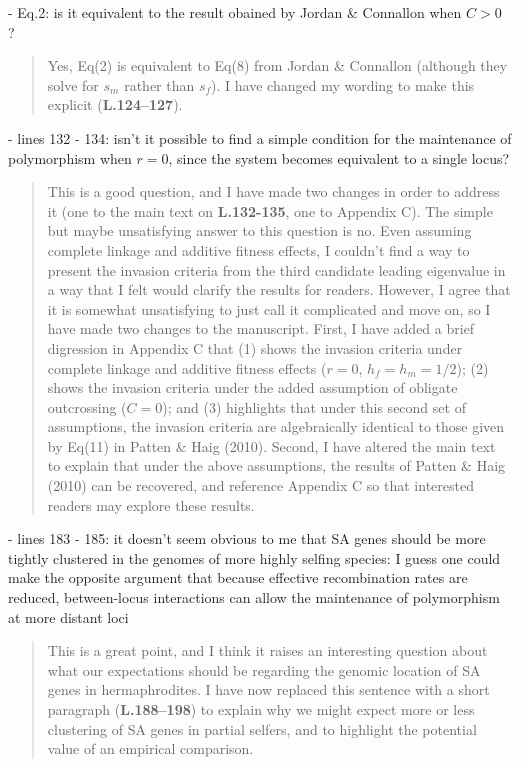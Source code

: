 \documentclass[11pt]{article}
\begin{document}
 - Eq.2: is it equivalent to the result obained by Jordan \& Connallon when $C > 0$ ?

	\begin{quote}
		Yes, Eq(2) is equivalent to Eq(8) from Jordan \& Connallon (although they solve for $s_m$ rather than $s_f$). I have changed my wording to make this explicit (\textbf{L.124--127}).
	\end{quote}

 - lines 132 - 134: isn't it possible to find a simple condition for the maintenance of polymorphism when $r=0$, since the system becomes equivalent to a single locus?

	\begin{quote}
		This is a good question, and I have made two changes in order to address it (one to the main text on \textbf{L.132-135}, one to Appendix C). The simple but maybe unsatisfying answer to this question is no. Even assuming complete linkage and additive fitness effects, I couldn't find a way to present the invasion criteria from the third candidate leading eigenvalue in a way that I felt would clarify the results for readers. However, I agree that it is somewhat unsatisfying to just call it complicated and move on, so I have made two changes to the manuscript. First, I have added a brief digression in Appendix C that (1) shows the invasion criteria under complete linkage and additive fitness effects ($r=0$, $h_f=h_m=1/2$); (2) shows the invasion criteria under the added assumption of obligate outcrossing ($C=0$); and (3) highlights that under this second set of assumptions, the invasion criteria are algebraically identical to those given by Eq(11) in Patten \& Haig (2010). Second, I have altered the main text to explain that under the above assumptions, the results of Patten \& Haig (2010) can be recovered, and reference Appendix C so that interested readers may explore these results.
	\end{quote}

 - lines 183 - 185: it doesn't seem obvious to me that SA genes should be more tightly clustered in the genomes of more highly selfing species: I guess one could make the opposite argument that because effective recombination rates are reduced, between-locus interactions can allow the maintenance of polymorphism at more distant loci

	\begin{quote}
		This is a great point, and I think it raises an interesting question about what our expectations should be regarding the genomic location of SA genes in hermaphrodites. I have now replaced this sentence with a short paragraph (\textbf{L.188--198}) to explain why we might expect more or less clustering of SA genes in partial selfers, and to highlight the potential value of an empirical comparison. 
	\end{quote}
\end{document}

